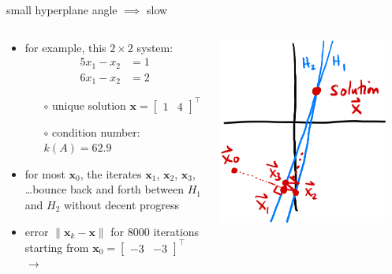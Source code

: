 \documentclass[usepdftitle=false,usenames,dvipsnames]{beamer}
\newcommand{\bx}{\mathbf{x}}
\begin{document}
\begin{frame}{small hyperplane angle $\implies$ slow}

\begin{columns}
\begin{column}{0.6\textwidth}
\begin{itemize}
\item for example, this $2\times 2$ system:
\begin{align*}
5 x_1 - x_2 &= 1 \\
6 x_1 - x_2 &= 2
\end{align*}

    \begin{itemize}
    \item[$\circ$] unique solution $\bx = \begin{bmatrix} 1 & 4 \end{bmatrix}^\top$
    \item[$\circ$] condition number: $k(A) = 62.9$
    \end{itemize}
\item for most $\bx_0$, the iterates $\bx_1$, $\bx_2$,  $\bx_3$, \dots bounce back and forth between $H_1$ and $H_2$ without decent progress
\item error $\|\bx_k - \bx\|$ for 8000 iterations starting from $\bx_0 = \begin{bmatrix} -3 & -3 \end{bmatrix}^\top$ \hfill $\to$
\end{itemize}
\end{column}
\begin{column}{0.4\textwidth}
\hfill \includegraphics[width=0.9\textwidth]{figs/bad2.png}


\end{column}
\end{columns}
\end{frame}
\end{document}
